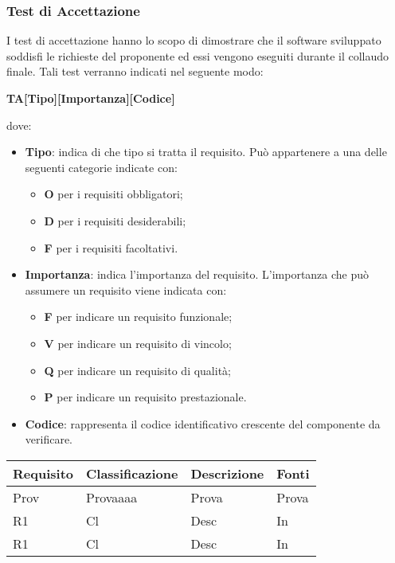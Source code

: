 \subsubsection{Test di Accettazione}
I test di accettazione hanno lo scopo di dimostrare che il software sviluppato 
soddisfi le richieste del proponente ed essi vengono eseguiti durante il
collaudo finale. Tali test verranno indicati nel seguente modo: \\
	\centerline{\textbf{TA[Tipo][Importanza][Codice]}}
dove:
\begin{itemize}
	\item \textbf{Tipo}: indica di che tipo si tratta il requisito. Può
		appartenere a una delle seguenti categorie indicate con:
		\begin{itemize}
			\item \textbf{O} per i requisiti obbligatori;
			\item \textbf{D} per i requisiti desiderabili;
			\item \textbf{F} per i requisiti facoltativi.			
		\end{itemize}
	\item \textbf{Importanza}: indica l'importanza del requisito. L'importanza
		che può assumere un requisito viene indicata con:
		\begin{itemize}
			\item \textbf{F} per indicare un requisito funzionale;
			\item \textbf{V} per indicare un requisito di vincolo;
			\item \textbf{Q} per indicare un requisito di qualità;
			\item \textbf{P} per indicare un requisito prestazionale. 
		\end{itemize}
	\item \textbf{Codice}: rappresenta il codice identificativo crescente
		del componente da verificare.
\end{itemize}


\begin{table}[H]
	
	\begin{longtable}{ >{\centering}p{} >{\centering}p{}
			>{\centering}p{} >{\centering}p{}}
			
		\hline
		\rowcolorhead
		\textbf{\color{white}Requisito} 
		& \textbf{\color{white}Classificazione} 
		& \centering\textbf{\color{white}Descrizione}
		& \textbf{\color{white}Fonti} 
		\tabularnewline \hline 	
		
		
		Prov & Provaaaa & Prova & Prova 
		
		\tabularnewline 
		R1 & Cl & Desc & In 
		
		\tabularnewline 
		R1 & Cl & Desc & In
	
	
	\end{longtable}

\end{table}


